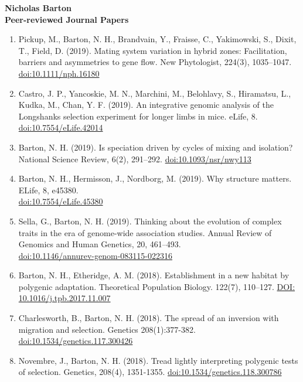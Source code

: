 \documentclass[10pt]{article}
\begin{document}
\begin{cv}
\begin{enumerate}
\end{enumerate}

\vspace{10pt}
\setlength{\oldcvlabelwidth}{\cvlabelwidth}

{\large \bf Nicholas Barton}\\

\textbf{\quad Peer-reviewed Journal Papers}
\begin{enumerate}	  \setlength\itemsep{0.2em}
\item Pickup, M., Barton, N. H., Brandvain, Y., Fraisse, C., Yakimowski, S., Dixit, T., Field, D. (2019). Mating system variation in hybrid zones: Facilitation, barriers and asymmetries to gene flow. New Phytologist, 224(3), 1035–1047. 
\href{https://doi.org/10.1111/nph.16180}{doi:10.1111/nph.16180}
\item Castro, J. P., Yancoskie, M. N., Marchini, M., Belohlavy, S., Hiramatsu, L., Kudka, M., Chan, Y. F. (2019). An integrative genomic analysis of the Longshanks selection experiment for longer limbs in mice. eLife, 8.
\href{https://doi.org/10.7554/eLife.42014}{doi:10.7554/eLife.42014}
\item Barton, N. H. (2019). Is speciation driven by cycles of mixing and isolation? National Science Review, 6(2), 291–292.
\href{https://doi.org/10.1093/nsr/nwy113}{doi:10.1093/nsr/nwy113}
\item Barton, N. H., Hermisson, J., Nordborg, M. (2019). Why structure matters. ELife, 8, e45380.
\\ \href{https://doi.org/10.7554/eLife.45380}{doi:10.7554/eLife.45380}
\item Sella, G., Barton, N. H. (2019). Thinking about the evolution of complex traits in the era of genome-wide association studies. Annual Review of Genomics and Human Genetics, 20, 461–493. \\
\href{https://research-explorer.app.ist.ac.at/record/6855}{doi:10.1146/annurev-genom-083115-022316} 
\item Barton, N. H., Etheridge, A. M. (2018). Establishment in a new habitat by polygenic adaptation. Theoretical Population Biology. 122(7), 110–127.
\href{https://research-explorer.app.ist.ac.at/record/564}{DOI: 10.1016/j.tpb.2017.11.007}
\item Charlesworth, B., Barton, N. H. (2018). The spread of an inversion with migration and selection. Genetics 208(1):377-382. 
\href{http://dx.doi.org/10.1534/genetics.117.300426}{doi:10.1534/genetics.117.300426}
\item Novembre, J., Barton, N. H. (2018). Tread lightly interpreting polygenic tests of selection. Genetics, 208(4), 1351-1355. \href{http://dx.doi.org/10.1534/genetics.118.300786}{doi:10.1534/genetics.118.300786}

\end{enumerate}
\end{cv}
\end{document}
